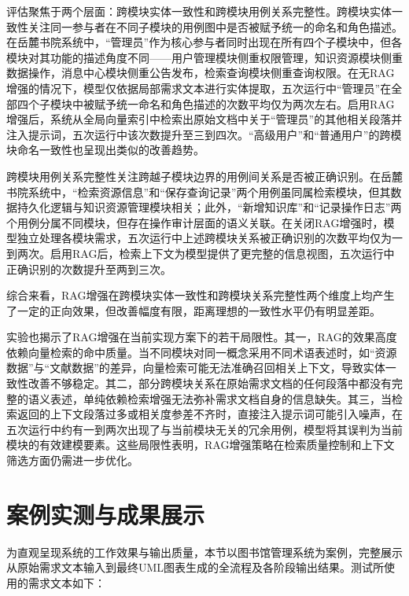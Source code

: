 评估聚焦于两个层面：跨模块实体一致性和跨模块用例关系完整性。跨模块实体一致性关注同一参与者在不同子模块的用例图中是否被赋予统一的命名和角色描述。在岳麓书院系统中，“管理员”作为核心参与者同时出现在所有四个子模块中，但各模块对其功能的描述角度不同——用户管理模块侧重权限管理，知识资源模块侧重数据操作，消息中心模块侧重公告发布，检索查询模块侧重查询权限。在无RAG增强的情况下，模型仅依据局部需求文本进行实体提取，五次运行中“管理员”在全部四个子模块中被赋予统一命名和角色描述的次数平均仅为两次左右。启用RAG增强后，系统从全局向量索引中检索出原始文档中关于“管理员”的其他相关段落并注入提示词，五次运行中该次数提升至三到四次。“高级用户”和“普通用户”的跨模块命名一致性也呈现出类似的改善趋势。

跨模块用例关系完整性关注跨越子模块边界的用例间关系是否被正确识别。在岳麓书院系统中，“检索资源信息”和“保存查询记录”两个用例虽同属检索模块，但其数据持久化逻辑与知识资源管理模块相关；此外，“新增知识库”和“记录操作日志”两个用例分属不同模块，但存在操作审计层面的语义关联。在关闭RAG增强时，模型独立处理各模块需求，五次运行中上述跨模块关系被正确识别的次数平均仅为一到两次。启用RAG后，检索上下文为模型提供了更完整的信息视图，五次运行中正确识别的次数提升至两到三次。

综合来看，RAG增强在跨模块实体一致性和跨模块关系完整性两个维度上均产生了一定的正向效果，但改善幅度有限，距离理想的一致性水平仍有明显差距。

实验也揭示了RAG增强在当前实现方案下的若干局限性。其一，RAG的效果高度依赖向量检索的命中质量。当不同模块对同一概念采用不同术语表述时，如“资源数据”与“文献数据”的差异，向量检索可能无法准确召回相关上下文，导致实体一致性改善不够稳定。其二，部分跨模块关系在原始需求文档的任何段落中都没有完整的语义表述，单纯依赖检索增强无法弥补需求文档自身的信息缺失。其三，当检索返回的上下文段落过多或相关度参差不齐时，直接注入提示词可能引入噪声，在五次运行中约有一到两次出现了与当前模块无关的冗余用例，模型将其误判为当前模块的有效建模要素。这些局限性表明，RAG增强策略在检索质量控制和上下文筛选方面仍需进一步优化。

\section{案例实测与成果展示}

为直观呈现系统的工作效果与输出质量，本节以图书馆管理系统为案例，完整展示从原始需求文本输入到最终UML图表生成的全流程及各阶段输出结果。测试所使用的需求文本如下：

